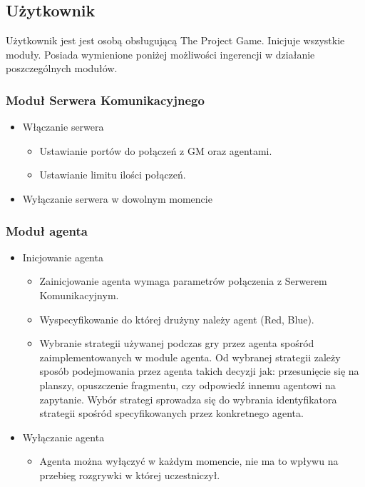 \documentclass[../Dokumentacja.tex]{subfiles}
\begin{document}
\subsection{Użytkownik}
Użytkownik jest jest osobą obsługującą The Project Game.
Inicjuje wszystkie moduły. Posiada wymienione poniżej możliwości ingerencji
w działanie poszczególnych modułów.
\subsubsection{Moduł Serwera Komunikacyjnego}

\begin{itemize}
    \item Włączanie serwera
    \begin{itemize}
    	\item Ustawianie portów do połączeń z GM oraz agentami.
    	\item Ustawianie limitu ilości połączeń.
    \end{itemize}
    \item Wyłączanie serwera w dowolnym momencie
\end{itemize}

\subsubsection{Moduł agenta}
\begin{itemize}
	\item Inicjowanie agenta
	\begin{itemize}
		\item Zainicjowanie agenta wymaga parametrów połączenia z Serwerem Komunikacyjnym.
		\item Wyspecyfikowanie do której drużyny należy agent (Red, Blue).
		\item Wybranie strategii używanej podczas gry przez agenta spośród zaimplementowanych w module agenta. Od wybranej strategii zależy sposób podejmowania przez agenta takich decyzji jak: przesunięcie się na planszy, opuszczenie fragmentu, czy odpowiedź innemu agentowi na zapytanie. Wybór strategi sprowadza się do wybrania identyfikatora strategii spośród specyfikowanych przez konkretnego agenta.
	\end{itemize}
	\item Wyłączanie agenta
	\begin{itemize}
		\item Agenta można wyłączyć w każdym momencie, nie ma to wpływu na przebieg rozgrywki w której uczestniczył.
	\end{itemize}
\end{itemize}
\end{document}
